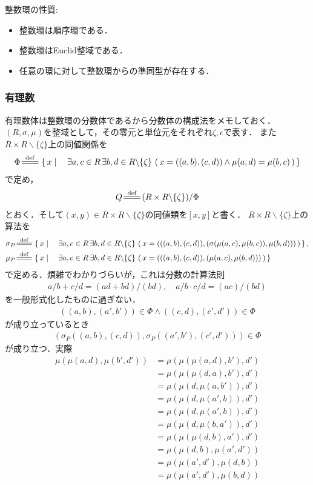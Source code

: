 	整数環の性質:
	\begin{itemize}
		\item 整数環は順序環である．
		\item 整数環はEuclid整域である．
		\item 任意の環に対して整数環からの準同型が存在する．
	\end{itemize}
	
\subsubsection{有理数}
	有理数体は整数環の分数体であるから分数体の構成法をメモしておく．
	$(R,\sigma,\mu)$を整域として，その零元と単位元をそれぞれ$\zeta,\epsilon$で表す．
	また$R \times R \backslash \{\zeta\}$上の同値関係を
	\begin{align}
		\Phi \defeq \Set{x}{\exists a,c \in R\, \exists b,d \in R \backslash \{\zeta\}\, \left(\, x=((a,b),(c,d)) \wedge \mu(a,d) = \mu(b,c)\, \right)}
	\end{align}
	で定め，
	\begin{align}
		Q \defeq (R \times R \backslash \{\zeta\}) / \Phi
	\end{align}
	とおく．そして$(x,y) \in R \times R \backslash \{\zeta\}$の同値類を$[x,y]$と書く．
	$R \times R \backslash \{\zeta\}$上の算法を
	\begin{align}
		\sigma_P &\defeq \Set{x}{\exists a,c \in R\, \exists b,d \in R \backslash \{\zeta\}\, \left(\, x=(((a,b),(c,d)),(\sigma(\mu(a,c),\mu(b,c)),\mu(b,d)))\, \right)}, \\
		\mu_P &\defeq \Set{x}{\exists a,c \in R\, \exists b,d \in R \backslash \{\zeta\}\, \left(\, x=(((a,b),(c,d)),(\mu(a,c),\mu(b,d)))\, \right)}
	\end{align}
	で定める．煩雑でわかりづらいが，これは分数の計算法則
	\begin{align}
		a/b + c/d = (ad + bd)/(bd),\quad a/b \cdot c/d = (ac)/(bd)
	\end{align}
	を一般形式化したものに過ぎない．
	\begin{align}
		((a,b),(a',b')) \in \Phi \wedge ((c,d),(c',d')) \in \Phi
	\end{align}
	が成り立っているとき
	\begin{align}
		\left(\sigma_P((a,b),(c,d)),\sigma_P((a',b'),(c',d'))\right) \in \Phi
	\end{align}
	が成り立つ．実際
	\begin{align}
		\mu(\mu(a,d),\mu(b',d')) &= \mu(\mu(\mu(a,d),b'),d') \\
		&= \mu(\mu(\mu(d,a),b'),d') \\
		&= \mu(\mu(d,\mu(a,b')),d') \\
		&= \mu(\mu(d,\mu(a',b)),d') \\
		&= \mu(\mu(d,\mu(a',b)),d') \\
		&= \mu(\mu(d,\mu(b,a')),d') \\
		&= \mu(\mu(\mu(d,b),a'),d') \\
		&= \mu(\mu(d,b),\mu(a',d')) \\
		&= \mu(\mu(a',d'),\mu(d,b)) \\
		&= \mu(\mu(a',d'),\mu(b,d)) \\
	\end{align}
